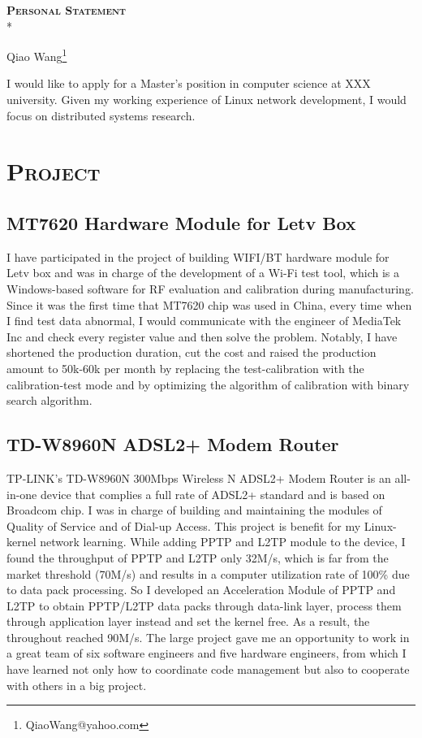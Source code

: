\documentclass{article}
\begin{document}
	\begin{center}
		\textsc{\textbf{{\LARGE{}Personal Statement}}}\\*
	\end{center}
	\begin{center}
		Qiao Wang\footnote{QiaoWang@yahoo.com}
	\end{center}
	\begin{multicols}{2}
		I would like to apply for a Master's position in computer science at XXX university. Given my working experience of Linux network development, I would focus on distributed systems research.
		\section{\textsc{Project}}
		\subsection{MT7620 Hardware Module for Letv Box}
		I have participated in the project of building WIFI/BT hardware module for Letv box and was in charge of the development of a Wi-Fi test tool, which is a Windows-based software for RF evaluation and calibration during manufacturing. Since it was the first time that MT7620 chip was used in China, every time when I find test data abnormal, I would communicate with the engineer of MediaTek Inc and check every register value and then solve the problem. Notably, I have shortened the production duration, cut the cost and raised the production amount to 50k-60k per month by replacing the test-calibration with the calibration-test mode and by optimizing the algorithm of calibration with binary search algorithm.
		\subsection{TD-W8960N ADSL2+ Modem Router}
		TP-LINK’s TD-W8960N 300Mbps Wireless N ADSL2+ Modem Router is an all-in-one device that complies a full rate of ADSL2+ standard and is based on Broadcom chip. I was in charge of building and maintaining the modules of Quality of Service and of Dial-up Access. This project is benefit for my Linux-kernel network learning. While adding PPTP and L2TP module to the device, I found the throughput of PPTP and L2TP only 32M/s, which is far from the market threshold (70M/s) and results in a computer utilization rate of 100\% due to data pack processing. So I developed an Acceleration Module of PPTP and L2TP to obtain PPTP/L2TP data packs through data-link layer, process them through application layer instead and set the kernel free. As a result, the throughout reached 90M/s. The large project gave me an opportunity to work in a great team of six software engineers and five hardware engineers, from which I have learned not only how to coordinate code management but also to cooperate with others in a big project.

\end{multicols}
\end{document}
